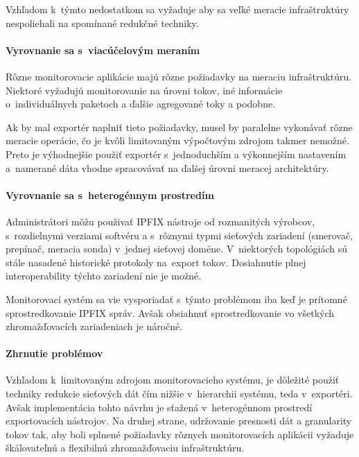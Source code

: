Vzhľadom k~týmto nedostatkom sa vyžaduje aby sa veľké meracie infraštruktúry nespoliehali na 
spomínané redukčné techniky.


\paragraph{Vyrovnanie sa s~viacúčelovým meraním}

Rôzne monitorovacie aplikácie majú rôzne požiadavky na meraciu infraštruktúru. Niektoré vyžadujú 
monitorovanie na úrovni tokov, iné informácie o~individuálnych paketoch a ďalšie agregované toky a podobne.

Ak by mal exportér naplniť tieto požiadavky, musel by paralelne vykonávať rôzne meracie operácie, čo je
kvôli limitovaným výpočtovým zdrojom takmer nemožné. Preto je výhodnejšie použiť exportér s~jednoduchším a 
výkonnejším nastavením a~namerané dáta vhodne spracovávať na ďalšej úrovni meracej architektúry.



\paragraph{Vyrovnanie sa s~heterogénnym prostredím}

Administrátori môžu použivať IPFIX nástroje od rozmanitých výrobcov, s~rozdielnymi verziami softvéru a
s~rôznymi typmi sieťových zariadení (smerovač, prepínač, meracia sonda) v~jednej sieťovej doméne.
V~niektorých topológiách sú stále nasadené historické protokoly na~export tokov. Dosiahnutie plnej 
interoperability týchto zariadení nie je možné.

Monitorovací systém sa vie vysporiadať s~týmto problémom iba keď je prítomné sprostredkovanie IPFIX správ.
Avšak obsiahnuť sprostredkovanie vo všetkých zhromažďovacích zariadeniach je náročné.


\paragraph{Zhrnutie problémov}

Vzhľadom k~limitovaným zdrojom monitorovacieho systému, je dôležité použiť techniky redukcie sieťových 
dát čím nižšie v~hierarchii systému, teda v~exportéri. Avšak implementácia tohto návrhu je sťažená
v~heterogénnom prostredí exportovacích nástrojov. 
Na druhej strane, udržovanie presnosti dát a granularity tokov tak, aby boli splnené požiadavky 
rôznych monitorovacích aplikácii vyžaduje škálovateľnú a flexibilnú zhromažďovaciu infraštruktúru.

